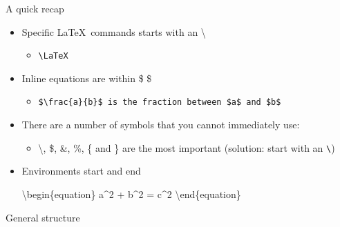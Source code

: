 \documentclass[ignorenonframetext,]{beamer}
\newenvironment{Shaded}{\begin{snugshade}}{\end{snugshade}}
\newcommand{\CommentTok}[1]{\textcolor[rgb]{0.56,0.35,0.01}{\textit{{#1}}}}
\newcommand{\NormalTok}[1]{{#1}}
\begin{document}
\begin{frame}[fragile]{A quick recap}

\begin{itemize}
\item
  Specific \LaTeX~commands starts with an \textbackslash{}

  \begin{itemize}
  \itemsep1pt\parskip0pt
  \item
    \texttt{\textbackslash{}LaTeX}
  \end{itemize}
\item
  Inline equations are within \$ \$

  \begin{itemize}
  \itemsep1pt\parskip0pt
  \item
    \texttt{\$\textbackslash{}frac\{a\}\{b\}\$ is the fraction between \$a\$ and \$b\$}
  \end{itemize}
\item
  There are a number of symbols that you cannot immediately use:

  \begin{itemize}
  \itemsep1pt\parskip0pt
  \item
    \textbackslash{}, \$, \&, \%, \{ and \} are the most important
    (solution: start with an \texttt{\textbackslash{}})
  \end{itemize}
\item
  Environments start and end

\begin{Shaded}
\begin{Highlighting}[]
\NormalTok{\textbackslash{}begin\{equation\} }
\NormalTok{a^2 + b^2 = c^2 }
\NormalTok{\textbackslash{}end\{equation\}}
\end{Highlighting}
\end{Shaded}
\end{itemize}

\end{frame}

\begin{frame}[fragile]{General structure}

\begin{Shaded}
\end{Shaded}

\end{frame}
\end{document}
